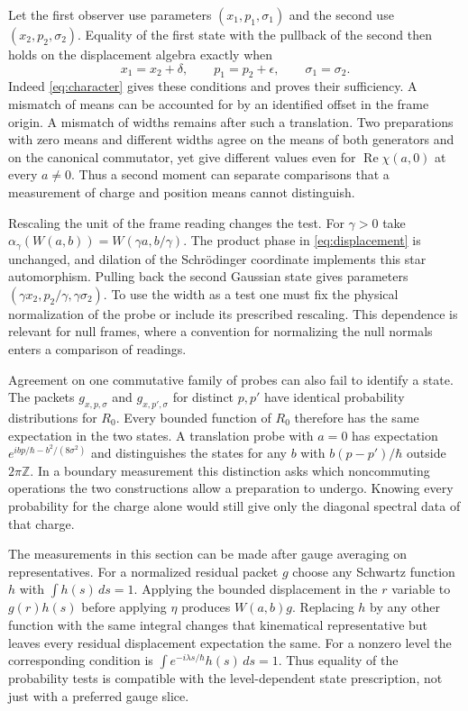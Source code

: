 \documentclass[11pt,letterpaper]{article}
\begin{document}
Let the first observer use parameters $(x_1,p_1,\sigma_1)$ and the second use
$(x_2,p_2,\sigma_2)$. Equality of the first state with the pullback of the second then holds on
the displacement algebra exactly when
\begin{equation}
 x_1=x_2+\delta,\qquad p_1=p_2+\epsilon,\qquad \sigma_1=\sigma_2 .
 \label{eq:state-match}
\end{equation}
Indeed \eqref{eq:character} gives these conditions and proves their sufficiency. A mismatch of
means can be accounted for by an identified offset in the frame origin. A mismatch of widths
remains after such a translation. Two preparations with zero means and different widths agree
on the means of both generators and on the canonical commutator, yet give different values even
for $\operatorname{Re}\chi(a,0)$ at every $a\ne0$. Thus a second moment can separate
comparisons that a measurement of charge and position means cannot distinguish.

Rescaling the unit of the frame reading changes the test. For $\gamma>0$ take
$\alpha_\gamma(W(a,b))=W(\gamma a,b/\gamma)$. The product phase in \eqref{eq:displacement} is
unchanged, and dilation of the Schr\"odinger coordinate implements this star automorphism.
Pulling back the second Gaussian state gives parameters $(\gamma
x_2,p_2/\gamma,\gamma\sigma_2)$. To use the width as a test one must fix the physical
normalization of the probe or include its prescribed rescaling. This dependence is relevant for
null frames, where a convention for normalizing the null normals enters a comparison of
readings.

Agreement on one commutative family of probes can also fail to identify a state. The packets
$g_{x,p,\sigma}$ and $g_{x,p',\sigma}$ for distinct $p,p'$ have identical probability
distributions for $R_0$. Every bounded function of $R_0$ therefore has the same expectation in
the two states. A translation probe with $a=0$ has expectation $e^{ibp/\hbar-b^2/(8\sigma^2)}$
and distinguishes the states for any $b$ with $b(p-p')/\hbar$ outside $2\pi\mathbb Z$. In a
boundary measurement this distinction asks which noncommuting operations the two constructions
allow a preparation to undergo. Knowing every probability for the charge alone would still give
only the diagonal spectral data of that charge.

The measurements in this section can be made after gauge averaging on representatives. For a
normalized residual packet $g$ choose any Schwartz function $h$ with $\int h(s)\,ds=1$.
Applying the bounded displacement in the $r$ variable to $g(r)h(s)$ before applying $\eta$
produces $W(a,b)g$. Replacing $h$ by any other function with the same integral changes that
kinematical representative but leaves every residual displacement expectation the same. For a
nonzero level the corresponding condition is $\int e^{-i\lambda s/\hbar}h(s)\,ds=1$. Thus
equality of the probability tests is compatible with the level-dependent state prescription,
not just with a preferred gauge slice.
\end{document}
